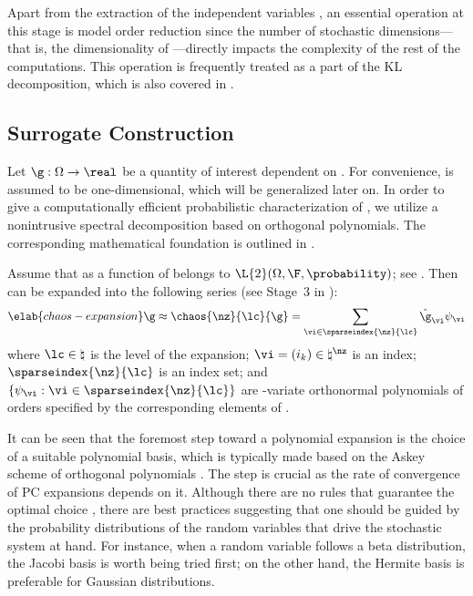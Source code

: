Apart from the extraction of the independent variables \vz, an essential
operation at this stage is model order reduction since the number of stochastic
dimensions---that is, the dimensionality of \vz---directly impacts the
complexity of the rest of the computations. This operation is frequently treated
as a part of the \ac{KL} decomposition, which is also covered in
.

\subsection{Surrogate Construction}

Let $\g: \Omega \to \real$ be a quantity of interest dependent on \vu. For
convenience, \g is assumed to be one-dimensional, which will be generalized
later on. In order to give a computationally efficient probabilistic
characterization of \g, we utilize a nonintrusive spectral decomposition based
on orthogonal polynomials. The corresponding mathematical foundation is outlined
in .

Assume that \g as a function of \vu belongs to $\L{2}(\Omega, \F,
\probability)$; see . Then \g can be expanded into the
following series (see Stage~3 in ):
\begin{equation} \elab{chaos-expansion}
  \g \approx \chaos{\nz}{\lc}{\g} = \sum_{\vi \in \sparseindex{\nz}{\lc}} \hat{\g}_{\vi} \psi_{\vi}
\end{equation}
where $\lc \in \natural$ is the level of the expansion; $\vi = (i_k) \in
\natural^\nz$ is an index; $\sparseindex{\nz}{\lc}$ is an index set; and $\{
\psi_{\vi}: \vi \in \sparseindex{\nz}{\lc} \}$ are \nz-variate orthonormal
polynomials of orders specified by the corresponding elements of \vi.

It can be seen that the foremost step toward a polynomial expansion is the
choice of a suitable polynomial basis, which is typically made based on the
Askey scheme of orthogonal polynomials \cite{xiu2010}. The step is crucial as
the rate of convergence of \ac{PC} expansions depends on it. Although there are
no rules that guarantee the optimal choice \cite{knio2006}, there are best
practices suggesting that one should be guided by the probability distributions
of the random variables that drive the stochastic system at hand. For instance,
when a random variable follows a beta distribution, the Jacobi basis is worth
being tried first; on the other hand, the Hermite basis is preferable for
Gaussian distributions.

